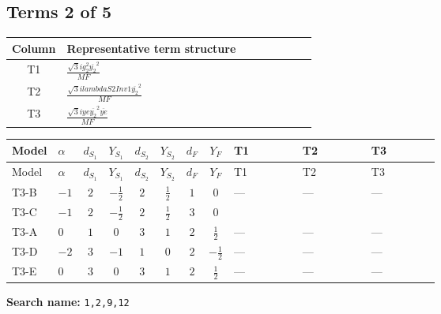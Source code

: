 \documentclass[8pt]{article}
\begin{document}
\begin{landscape}
\subsection*{Terms 2 of 5}
\begin{center}
\begin{tabular}{@{}c >{\raggedright\arraybackslash}p{0.82\linewidth}@{}}
\toprule
Column & Representative term structure \\
\midrule
T1 & \(\displaystyle \frac{\sqrt{3} i g_{2}^{2} \overline{y_{2}}^{2}}{MF}\) \\
\midrule
T2 & \(\displaystyle \frac{\sqrt{3} i lambdaS2Inv1 \overline{y_{2}}^{2}}{MF}\) \\
\midrule
T3 & \(\displaystyle \frac{\sqrt{3} i ye \overline{y_{2}}^{2} \overline{ye}}{MF}\) \\
\midrule
\bottomrule
\end{tabular}
\end{center}
\smallskip
\tiny
\begin{longtable}{@{}llcccccc >{\raggedright\arraybackslash}p{0.21\linewidth} >{\raggedright\arraybackslash}p{0.21\linewidth} >{\raggedright\arraybackslash}p{0.21\linewidth}@{}}
\toprule
Model & $\alpha$ & $d_{S_1}$ & $Y_{S_1}$ & $d_{S_2}$ & $Y_{S_2}$ & $d_F$ & $Y_F$ & T1 & T2 & T3 \\
\midrule
\endfirsthead
\toprule
Model & $\alpha$ & $d_{S_1}$ & $Y_{S_1}$ & $d_{S_2}$ & $Y_{S_2}$ & $d_F$ & $Y_F$ & T1 & T2 & T3 \\
\midrule
\endhead
T3-B & $-1$ & $2$ & $-\frac{1}{2}$ & $2$ & $\frac{1}{2}$ & $1$ & $0$ & --- & --- & --- \\
\midrule
T3-C & $-1$ & $2$ & $-\frac{1}{2}$ & $2$ & $\frac{1}{2}$ & $3$ & $0$ & \scriptsize\adjustbox{max width=\linewidth}{$\begin{gathered} \frac{\sqrt{3} i g_{2}^{2} \overline{y_{2}}^{2}}{8 MF}\end{gathered}$} & \scriptsize\adjustbox{max width=\linewidth}{$\begin{gathered} \frac{\sqrt{3} i lambdaS2Inv1 \overline{y_{2}}^{2}}{12 MF}\end{gathered}$} & \scriptsize\adjustbox{max width=\linewidth}{$\begin{gathered} - \frac{\sqrt{3} i ye \overline{y_{2}}^{2} \overline{ye}}{24 MF}\end{gathered}$} \\
\midrule
T3-A & $0$ & $1$ & $0$ & $3$ & $1$ & $2$ & $\frac{1}{2}$ & --- & --- & --- \\
\midrule
T3-D & $-2$ & $3$ & $-1$ & $1$ & $0$ & $2$ & $-\frac{1}{2}$ & --- & --- & --- \\
\midrule
T3-E & $0$ & $3$ & $0$ & $3$ & $1$ & $2$ & $\frac{1}{2}$ & --- & --- & --- \\
\midrule
\bottomrule
\end{longtable}
\clearpage
\noindent\textbf{Search name: }\texttt{1,2,9,12}\par\smallskip

\end{landscape}
\end{document}
